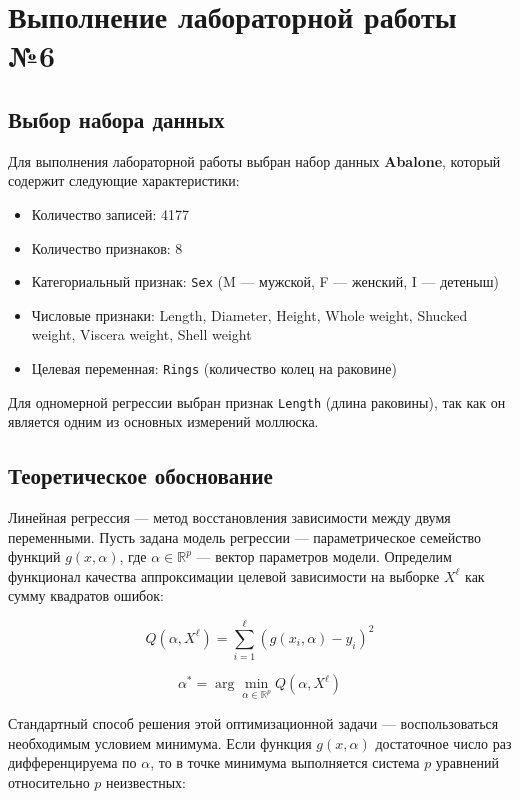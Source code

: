 \chapter{Выполнение лабораторной работы №6}
\label{ch:lab6}

\section{Выбор набора данных}

Для выполнения лабораторной работы выбран набор данных \textbf{Abalone}, который содержит следующие характеристики:

\begin{itemize}
    \item Количество записей: 4177
    \item Количество признаков: 8
    \item Категориальный признак: \texttt{Sex} (M --- мужской, F --- женский, I --- детеныш)
    \item Числовые признаки: Length, Diameter, Height, Whole weight, Shucked weight, Viscera weight, Shell weight
    \item Целевая переменная: \texttt{Rings} (количество колец на раковине)
\end{itemize}

Для одномерной регрессии выбран признак \texttt{Length} (длина раковины), так как он является одним из основных измерений моллюска.

\section{Теоретическое обоснование}

Линейная регрессия — метод восстановления зависимости между двумя переменными. Пусть задана модель регрессии — параметрическое семейство функций $g(x, \alpha)$, где $\alpha \in \mathbb{R}^p$ — вектор параметров модели. Определим функционал качества аппроксимации целевой зависимости на выборке $X^\ell$ как сумму квадратов ошибок:

\[Q(\alpha, X^\ell) = \sum_{i=1}^{\ell} (g(x_i, \alpha) - y_i)^2\]

\[\alpha^* = \arg \min_{\alpha \in \mathbb{R}^p} Q(\alpha, X^\ell)\]

Стандартный способ решения этой оптимизационной задачи — воспользоваться необходимым условием минимума. Если функция $g(x, \alpha)$ достаточное число раз дифференцируема по $\alpha$, то в точке минимума выполняется система $p$ уравнений относительно $p$ неизвестных:

